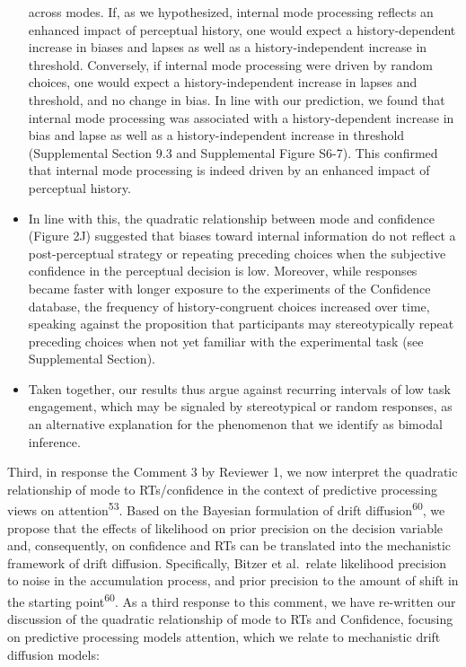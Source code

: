 \documentclass[
]{article}
\begin{document}
\begin{itemize}
  across modes. If, as we hypothesized, internal mode processing
  reflects an enhanced impact of perceptual history, one would expect a
  history-dependent increase in biases and lapses as well as a
  history-independent increase in threshold. Conversely, if internal
  mode processing were driven by random choices, one would expect a
  history-independent increase in lapses and threshold, and no change in
  bias. In line with our prediction, we found that internal mode
  processing was associated with a history-dependent increase in bias
  and lapse as well as a history-independent increase in threshold
  (Supplemental Section 9.3 and Supplemental Figure S6-7). This
  confirmed that internal mode processing is indeed driven by an
  enhanced impact of perceptual history.
\item
  In line with this, the quadratic relationship between mode and
  confidence (Figure 2J) suggested that biases toward internal
  information do not reflect a post-perceptual strategy or repeating
  preceding choices when the subjective confidence in the perceptual
  decision is low. Moreover, while responses became faster with longer
  exposure to the experiments of the Confidence database, the frequency
  of history-congruent choices increased over time, speaking against the
  proposition that participants may stereotypically repeat preceding
  choices when not yet familiar with the experimental task (see
  Supplemental Section).
\item
  Taken together, our results thus argue against recurring intervals of
  low task engagement, which may be signaled by stereotypical or random
  responses, as an alternative explanation for the phenomenon that we
  identify as bimodal inference.
\end{itemize}

Third, in response the Comment 3 by Reviewer 1, we now interpret the
quadratic relationship of mode to RTs/confidence in the context of
predictive processing views on attention\textsuperscript{53}. Based on
the Bayesian formulation of drift diffusion\textsuperscript{60}, we
propose that the effects of likelihood on prior precision on the
decision variable and, consequently, on confidence and RTs can be
translated into the mechanistic framework of drift diffusion.
Specifically, Bitzer et al.~relate likelihood precision to noise in the
accumulation process, and prior precision to the amount of shift in the
starting point\textsuperscript{60}. As a third response to this comment,
we have re-written our discussion of the quadratic relationship of mode
to RTs and Confidence, focusing on predictive processing models
attention, which we relate to mechanistic drift diffusion models:
\end{document}
